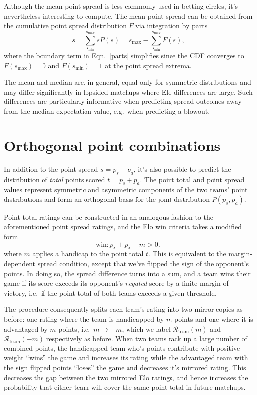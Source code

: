 \documentclass[aps,prc,reprint,amsmath,superscriptaddress]{revtex4-1}
\begin{document}
Although the mean point spread is less commonly used in betting circles, it's nevertheless interesting to compute.
The mean point spread can be obtained from the cumulative point spread distribution $F$ via integration by parts
\begin{equation}
  \label{parts}
  \bar{s} = \sum\limits_{s_\text{min}}^{s_\text{max}} s P(s) = s_\text{max} - \sum\limits_{s_\text{min}}^{s_\text{max}} F(s),
\end{equation}
where the boundary term in Eqn.~\ref{parts} simplifies since the CDF converges to $F(s_\text{max})=0$ and $F(s_\text{min})=1$ at the point spread extrema.

The mean and median are, in general, equal only for symmetric distributions and may differ significantly in lopsided matchups where Elo differences are large.
Such differences are particularly informative when predicting spread outcomes away from the median expectation value, e.g.\ when predicting a blowout. 

\section{Orthogonal point combinations}

In addition to the point spread $s = p_s - p_a$, it's also possible to predict the distribution of \emph{total} points scored $t = p_s + p_a$.
The point total and point spread values represent symmetric and asymmetric components of the two teams' point distributions and form an orthogonal basis for the joint distribution $P(p_s, p_a)$. 

Point total ratings can be constructed in an analogous fashion to the aforementioned point spread ratings, and the Elo win criteria takes a modified form
\begin{equation}
  \label{win_total}
  \text{win}: p_s + p_a - m > 0,
\end{equation}
where $m$ applies a handicap to the point total $t$.
This is equivalent to the margin-dependent spread condition, except that we've flipped the sign of the opponent's points.
In doing so, the spread difference turns into a sum, and a team wins their game if its score exceeds its opponent's \emph{negated} score by a finite margin of victory, i.e.\ if the point total of both teams exceeds a given threshold.

The procedure consequently splits each team's rating into two mirror copies as before: one rating where the team is handicapped by $m$ points and one where it is advantaged by $m$ points, i.e.\ $m \rightarrow -m$, which we label $\mathcal{R}_\text{team}(m)$ and $\mathcal{R}_\text{team}(-m)$ respectively as before.
When two teams rack up a large number of combined points, the handicapped team who's points contribute with positive weight ``wins'' the game and increases its rating while the advantaged team with the sign flipped points ``loses'' the game and decreases it's mirrored rating.
This decreases the gap between the two mirrored Elo ratings, and hence increases the probability that either team will cover the same point total in future matchups.
\end{document}
